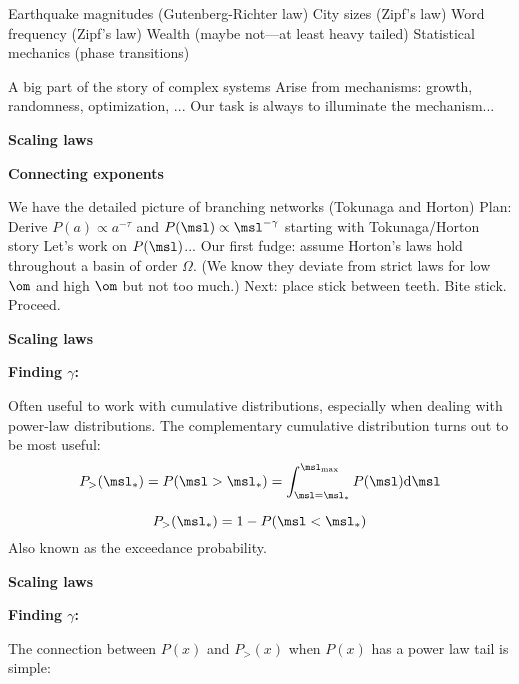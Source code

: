 \begin{frame}[label=]
\begin{frame}[label=]
\begin{frame}[label=]
\begin{frame}[label=]
\begin{frame}[label=]
\begin{frame}[label=]
\begin{frame}[label=]
\begin{frame}[label=]
\begin{frame}[label=]
\begin{frame}[label=]
\begin{frame}[label=]
\begin{frame}[label=]
\begin{frame}[label=]
\begin{frame}[label=]
\begin{frame}[label=]
\begin{frame}[label=]
\begin{frame}[label=]
\begin{frame}[label=]
\begin{frame}[label=]
\begin{frame}[label=]
\begin{frame}[label=]
\begin{frame}[label=]
\begin{frame}[label=]
       Earthquake magnitudes (Gutenberg-Richter law)
       City sizes (Zipf's law)
       Word frequency (Zipf's law)\cite{zipf1949a}
       Wealth (maybe not---at least heavy tailed)
       Statistical mechanics (phase transitions)\cite{goldenfeld1992a}
      
     A big part of the story of complex systems
     Arise from \alert{mechanisms}: growth, randomness, optimization, ...
     Our task is always to illuminate the mechanism...
    
  

\begin{frame}[label=]
  \textbf{Scaling laws}

  \textbf{Connecting exponents}
    
     We have the detailed picture of branching networks (Tokunaga and
      Horton)
     Plan: Derive $P(a) \propto a^{-\tau}$ and $P(\msl) \propto \msl^{-\gamma}$
      starting with Tokunaga/Horton story\cite{tarboton1990a,devries1994a,dodds1999a}
     Let's work on $P(\msl)$...
     Our first fudge: assume Horton's laws hold throughout a basin of
      order $\Omega$.
     (We know they deviate from strict laws for low $\om$ and high $\om$
      but not too much.)
     Next: place stick between teeth.  
      {Bite stick.}  
      {Proceed.}  
    
  

\begin{frame}[label=]
  \textbf{Scaling laws}

  \textbf{Finding $\gamma$:}
    
     Often useful to work with \alert{cumulative distributions},
      especially when dealing with power-law distributions.
     The complementary cumulative distribution turns out
      to be most useful:
      $$
      P_> (\msl_\ast) = 
      P (\msl > \msl_\ast) =
      \int_{\msl=\msl_{\ast}}^{\msl_{\max}} P(\msl) {\textnormal{d}}{\msl}
      $$
    
      $$
      P_> (\msl_\ast) =  1 - P(\msl < \msl_\ast)
      $$
     Also known as the exceedance probability.
    
  


\begin{frame}[label=]
  \textbf{Scaling laws}

  \textbf{Finding $\gamma$:}
    
      
        The connection between $P(x)$ and $P_>(x)$ 
        when $P(x)$ has a power law tail is simple:
      

\end{frame}
\end{frame}
\end{frame}
\end{frame}
\end{frame}
\end{frame}
\end{frame}
\end{frame}
\end{frame}
\end{frame}
\end{frame}
\end{frame}
\end{frame}
\end{frame}
\end{frame}
\end{frame}
\end{frame}
\end{frame}
\end{frame}
\end{frame}
\end{frame}
\end{frame}
\end{frame}
\end{frame}
\end{frame}
\end{frame}
